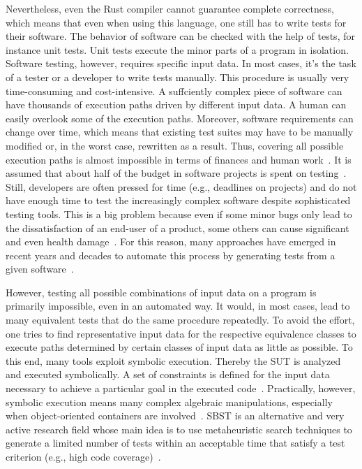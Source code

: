 \documentclass{article}
\begin{document}
Nevertheless, even the Rust compiler cannot guarantee complete correctness, which means that even when using this language, one still has to write tests for their software. The behavior of software can be checked with the help of tests, for instance unit tests. Unit tests execute the minor parts of a program in isolation. Software testing, however, requires specific input data. In most cases, it's the task of a tester or a developer to write tests manually. This procedure is usually very time-consuming and cost-intensive. A suffciently complex piece of software can have thousands of execution paths driven by different input data. A human can easily overlook some of the execution paths. Moreover, software requirements can change over time, which means that existing test suites may have to be manually modified or, in the worst case, rewritten as a result. Thus, covering all possible execution paths is almost impossible in terms of finances and human work~\cite{Myers2012}. It is assumed that about half of the budget in software projects is spent on testing~\cite{Beizer2003}. Still, developers are often pressed for time (e.g., deadlines on projects) and do not have enough time to test the increasingly complex software despite sophisticated testing tools. This is a big problem because even if some minor bugs only lead to the dissatisfaction of an end-user of a product, some others can cause significant and even health damage~\cite{Myers2012}. For this reason, many approaches have emerged in recent years and decades to automate this process by generating tests from a given software~\cite{McMinn_2004}.

However, testing all possible combinations of input data on a program is primarily impossible, even in an automated way. It would, in most cases, lead to many equivalent tests that do the same procedure repeatedly. To avoid the effort, one tries to find representative input data for the respective equivalence classes to execute paths determined by certain classes of input data as little as possible. To this end, many tools exploit symbolic execution. Thereby the \ac{SUT} is analyzed and executed symbolically. A set of constraints is defined for the input data necessary to achieve a particular goal in the executed code~\cite{Clarke1976}. Practically, however, symbolic execution means many complex algebraic manipulations, especially when object-oriented containers are involved~\cite{Korel1990}. \ac{SBST} is an alternative and very active research field whose main idea is to use metaheuristic search techniques to generate a limited number of tests within an acceptable time that satisfy a test criterion (e.g., high code coverage)~\cite{McMinn_2004}.
\end{document}
